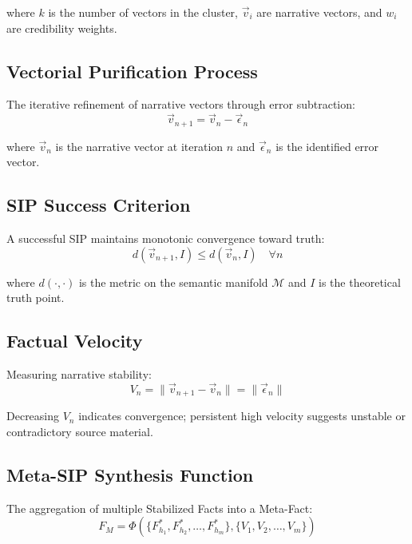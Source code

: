 \documentclass[11pt,a4paper]{article}
\begin{document}
where $k$ is the number of vectors in the cluster, $\vec{v}_i$ are narrative vectors, and $w_i$ are credibility weights.

\subsection*{Vectorial Purification Process}
The iterative refinement of narrative vectors through error subtraction:
\begin{equation}
\vec{v}_{n+1} = \vec{v}_{n} - \vec{\epsilon}_{n}
\label{eq:purification}
\end{equation}

where $\vec{v}_n$ is the narrative vector at iteration $n$ and $\vec{\epsilon}_n$ is the identified error vector.

\subsection*{SIP Success Criterion}
A successful SIP maintains monotonic convergence toward truth:
\begin{equation}
d(\vec{v}_{n+1}, I) \leq d(\vec{v}_{n}, I) \quad \forall n
\label{eq:convergence}
\end{equation}

where $d(\cdot,\cdot)$ is the metric on the semantic manifold $\mathcal{M}$ and $I$ is the theoretical truth point.

\subsection*{Factual Velocity}
Measuring narrative stability:
\begin{equation}
V_n = \|\vec{v}_{n+1} - \vec{v}_n\| = \|\vec{\epsilon}_n\|
\label{eq:velocity}
\end{equation}

\noindent Decreasing $V_n$ indicates convergence; persistent high velocity suggests unstable or contradictory source material.

\subsection*{Meta-SIP Synthesis Function}
The aggregation of multiple Stabilized Facts into a Meta-Fact:
\begin{equation}
F_M = \Phi\left(\{F_{h_1}^*, F_{h_2}^*, \ldots, F_{h_m}^*\}, \{V_1, V_2, \ldots, V_m\}\right)
\label{eq:metasip}
\end{equation}
\end{document}
